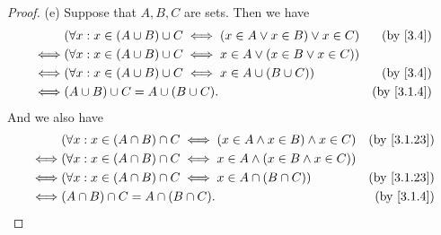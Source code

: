 \begin{proof}{(e)}
  Suppose that \(A, B, C\) are sets.
  Then we have
  \begin{align*}
         & (\forall x : x \in (A \cup B) \cup C \iff (x \in A \lor x \in B) \lor x \in C) & \text{(by \cref{3.4})}   \\
    \iff & (\forall x : x \in (A \cup B) \cup C \iff x \in A \lor (x \in B \lor x \in C))                            \\
    \iff & (\forall x : x \in (A \cup B) \cup C \iff x \in A \cup (B \cup C))             & \text{(by \cref{3.4})}   \\
    \iff & (A \cup B) \cup C = A \cup (B \cup C).                                         & \text{(by \cref{3.1.4})}
  \end{align*}
  And we also have
  \begin{align*}
         & (\forall x : x \in (A \cap B) \cap C \iff (x \in A \land x \in B) \land x \in C) & \text{(by \cref{3.1.23})} \\
    \iff & (\forall x : x \in (A \cap B) \cap C \iff x \in A \land (x \in B \land x \in C))                             \\
    \iff & (\forall x : x \in (A \cap B) \cap C \iff x \in A \cap (B \cap C))               & \text{(by \cref{3.1.23})} \\
    \iff & (A \cap B) \cap C = A \cap (B \cap C).                                           & \text{(by \cref{3.1.4})}
  \end{align*}
\end{proof}

